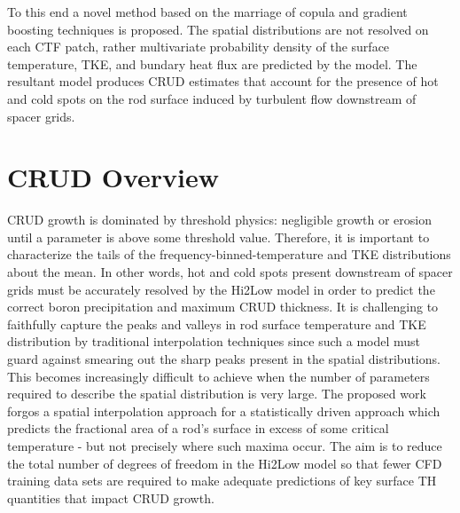To this end a novel method based on the marriage of copula and gradient boosting techniques
is proposed.  The spatial distributions are not resolved on each CTF patch, rather
multivariate probability density of the surface temperature, TKE, and bundary heat flux
are predicted by the model.
The resultant model produces CRUD estimates that account for the presence of
hot and cold spots on the rod surface induced by turbulent flow downstream of spacer grids.


\section{CRUD Overview}

CRUD growth is dominated by threshold physics: negligible growth or
erosion until a parameter is above some threshold value.  Therefore, it is
important to characterize the tails of the frequency-binned-temperature and
TKE distributions about the mean.  In other words, hot and cold spots
present downstream of spacer grids must be accurately resolved by the Hi2Low model
in order to predict the correct boron precipitation and maximum CRUD
thickness.  It is challenging to faithfully capture the peaks and valleys in
rod surface temperature and TKE distribution by traditional interpolation
techniques since such a model must guard against smearing out the sharp peaks
present in the spatial distributions.  This becomes increasingly difficult to
achieve when the number of parameters required to describe the spatial
distribution is very large.  The proposed work forgos a spatial interpolation
approach for a statistically driven approach which predicts the fractional
area of a rod's surface in excess of some critical temperature - but not
precisely where such maxima occur.  The aim is to reduce the total number of degrees of
freedom in the Hi2Low model so that fewer CFD training data sets are required
to make adequate predictions of key surface TH quantities that impact CRUD growth.
